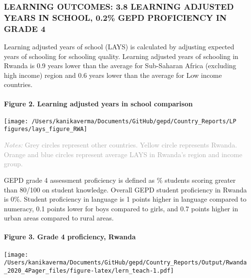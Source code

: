 \documentclass[twocolumn]{article}
\let\oldparagraph\paragraph
\renewcommand{\paragraph}[1]{\oldparagraph{#1}\mbox{}}
\begin{document}
\hypertarget{learning-outcomes-3.8-learning-adjusted-years-in-school-0.2-gepd-proficiency-in-grade-4}{%
\subsubsection{\texorpdfstring{\textbf{LEARNING OUTCOMES: 3.8 LEARNING
ADJUSTED YEARS IN SCHOOL, 0.2\% GEPD PROFICIENCY IN GRADE
4}}{LEARNING OUTCOMES: 3.8 LEARNING ADJUSTED YEARS IN SCHOOL, 0.2\% GEPD PROFICIENCY IN GRADE 4}}\label{learning-outcomes-3.8-learning-adjusted-years-in-school-0.2-gepd-proficiency-in-grade-4}}

Learning adjusted years of school (LAYS) is calculated by adjusting
expected years of schooling for schooling quality. Learning adjusted
years of schooling in Rwanda is 0.9 years lower than the average for
Sub-Saharan Africa (excluding high income) region and 0.6 years lower
than the average for Low income countries.

\hypertarget{figure-2.-learning-adjusted-years-in-school-comparison}{%
\paragraph{Figure 2. Learning adjusted years in school
comparison}\label{figure-2.-learning-adjusted-years-in-school-comparison}}

\texttt{[image: /Users/kanikaverma/Documents/GitHub/gepd/Country\_Reports/LP figures/lays\_figure\_RWA]}

{\scriptsize
    \textcolor{darkgray}{\textit{Notes:} Grey circles represent other countries. Yellow circle represents Rwanda. Orange and blue circles represent average LAYS in Rwanda's region and income group.}
  }

GEPD grade 4 assessment proficiency is defined as \% students scoring
greater than 80/100 on student knowledge. Overall GEPD student
proficiency in Rwanda is 0\%. Student proficiency in language is 1
points higher in language compared to numeracy, 0.1 points lower for
boys compared to girls, and 0.7 points higher in urban areas compared to
rural areas. \vfill\null

\hypertarget{figure-3.-grade-4-proficiency-rwanda}{%
\paragraph{Figure 3. Grade 4 proficiency,
Rwanda}\label{figure-3.-grade-4-proficiency-rwanda}}

\texttt{[image: /Users/kanikaverma/Documents/GitHub/gepd/Country\_Reports/Output/Rwanda\_2020\_4Pager\_files/figure-latex/lern\_teach-1.pdf]}
\end{document}
